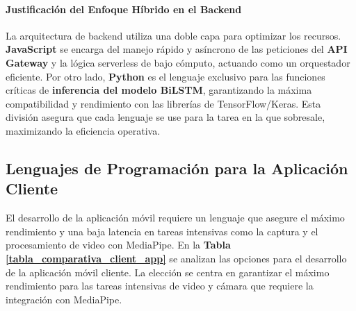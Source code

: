 \paragraph{Justificación del Enfoque Híbrido en el Backend}
La arquitectura de backend utiliza una doble capa para optimizar los recursos. \textbf{JavaScript} se encarga del manejo rápido y asíncrono de las peticiones del \textbf{API Gateway} y la lógica serverless de bajo cómputo, actuando como un orquestador eficiente. Por otro lado, \textbf{Python} es el lenguaje exclusivo para las funciones críticas de \textbf{inferencia del modelo BiLSTM}, garantizando la máxima compatibilidad y rendimiento con las librerías de TensorFlow/Keras. Esta división asegura que cada lenguaje se use para la tarea en la que sobresale, maximizando la eficiencia operativa.

\subsection{Lenguajes de Programación para la Aplicación Cliente}

El desarrollo de la aplicación móvil requiere un lenguaje que asegure el máximo rendimiento y una baja latencia en tareas intensivas como la captura y el procesamiento de video con MediaPipe. En la \textbf{Tabla \ref{tabla_comparativa_client_app}} se analizan las opciones para el desarrollo de la aplicación móvil cliente. La elección se centra en garantizar el máximo rendimiento para las tareas intensivas de video y cámara que requiere la integración con MediaPipe.

